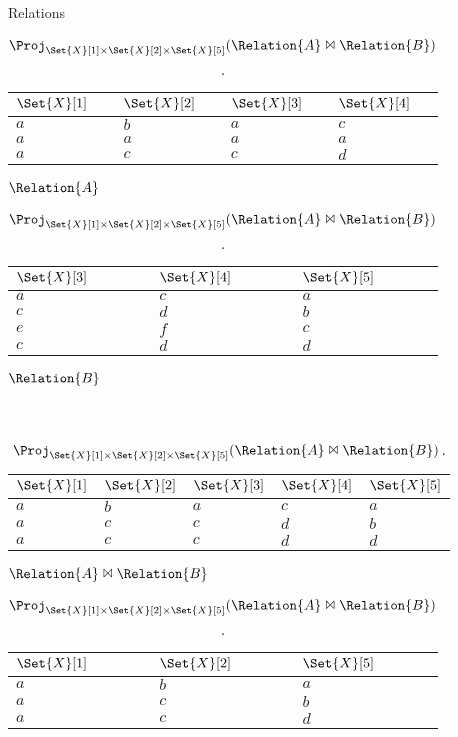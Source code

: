 \documentclass[ ../main.tex]{subfiles}
\begin{document}
\begin{example}
\begin{table}[h]
\centering
\caption{Relations}
\begin{subtable}[h]{.4\linewidth}
\centering
\begin{tabular}{llll}
\toprule
$\Set{X}[1]$ & $\Set{X}[2]$ & $\Set{X}[3]$ & $\Set{X}[4]$\\
\midrule
$a$ & $b$ & $a$ & $c$\\
$a$ & $a$ & $a$ & $a$\\
$a$ & $c$ & $c$ & $d$\\
\bottomrule
\end{tabular}
\caption{$\Relation{A}$}
\label{tbl:ex_r1}
\end{subtable}
\begin{subtable}[h]{.4\linewidth}
\centering
\begin{tabular}{lll} 
\toprule
$\Set{X}[3]$ & $\Set{X}[4]$ & $\Set{X}[5]$\\
\midrule
$a$ & $c$ & $a$\\
$c$ & $d$ & $b$\\
$e$ & $f$ & $c$\\
$c$ & $d$ & $d$\\
\bottomrule
\end{tabular}
\caption{$\Relation{B}$}
\label{tbl:ex_r2}
\end{subtable}\\
\begin{subtable}[h]{.4\linewidth}
\centering
\begin{tabular}{lllll}
\toprule
$\Set{X}[1]$ & $\Set{X}[2]$ & $\Set{X}[3]$ & $\Set{X}[4]$ & $\Set{X}[5]$\\
\midrule
$a$ & $b$ & $a$ & $c$ & $a$\\
$a$ & $c$ & $c$ & $d$ & $b$\\
$a$ & $c$ & $c$ & $d$ & $d$\\
\bottomrule
\end{tabular}
\caption{$\Relation{A} \Join \Relation{B}$}
\label{tbl:ex_join}
\end{subtable}
\begin{subtable}[h]{.4\linewidth}
\centering
\begin{tabular}{lll}
\toprule
$\Set{X}[1]$ & $\Set{X}[2]$ & $\Set{X}[5]$\\
\midrule
$a$ & $b$ & $a$\\
$a$ & $c$ & $b$\\
$a$ & $c$ & $d$\\
\bottomrule
\end{tabular}
\caption{$\Proj_{\Set{X}[1] \times \Set{X}[2] \times \Set{X}[5]}(\Relation{A} \Join \Relation{B})$.}
\label{tbl:ex_proj}
\end{subtable}
\end{table}
\end{example}
\end{document}

